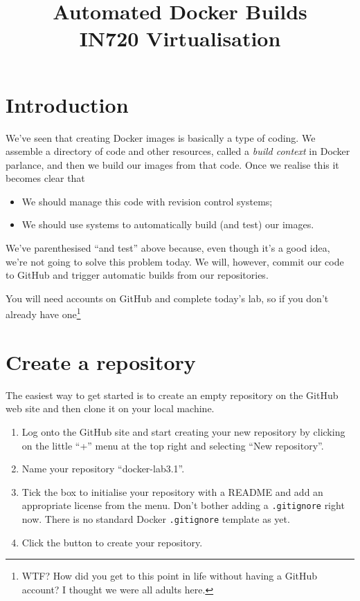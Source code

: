 \documentclass{article}
\begin{document}
\title{Automated Docker Builds\\ IN720 Virtualisation}
\date{}
\maketitle

\section*{Introduction}
We've seen that creating Docker images is basically a type of coding.  We assemble a directory of code and other resources, called a \emph{build context} in Docker parlance, and then we build our images from that code.  Once we realise this it becomes clear that

\begin{itemize}
	\item We should manage this code with revision control systems;
	\item We should use systems to automatically build (and test) our images.
\end{itemize}

We've parenthesised ``and test'' above because, even though it's a good idea, we're not going to solve this problem today.  We will, however, commit our code to GitHub and trigger automatic builds from our repositories.

You will need accounts on GitHub and complete today's lab, so if you don't already have one\footnote{WTF? How did you get to this point in life without having a GitHub account?  I thought we were all adults here.} 

\section{Create a repository}
The easiest way to get started is to create an empty repository on the GitHub web site and then clone it on your local machine.  
\begin{enumerate}
	\item Log onto the GitHub site and start creating your new repository by clicking on the little ``+'' menu at the top right and selecting ``New repository''.
	\item Name your repository ``docker-lab3.1''. 
	\item Tick the box to initialise your repository with a README and add an appropriate license from the menu.  Don't bother adding a \texttt{.gitignore} right now.  There is no standard Docker \texttt{.gitignore} template as yet.
	\item Click the button to create your repository.
\end{enumerate}
     
\end{document}
